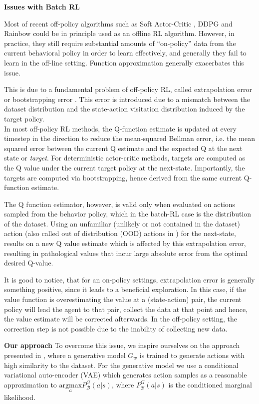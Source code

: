 \textbf{Issues with Batch RL}

Most of recent off-policy algorithms such as Soft Actor-Critic \citep{Haarnoja2018}, 
DDPG \citep{Lillicrap2016} and Rainbow \citep{Hessel2018}  could be in principle used 
as an offline RL algorithm. However, in practice, they still require substantial amounts
of “on-policy” data from the current behavioral policy in order to learn effectively, 
and generally they fail to learn in the off-line setting. Function approximation generally exacerbates this issue.


This is due to a fundamental problem of off-policy RL, called extrapolation error \citep{Fujimoto2019} or 
bootstrapping error \citep{Kumar2019}. This error is introduced due to a mismatch
between the dataset distribution and the state-action visitation distribution induced by the
target policy.\\
In most off-policy RL methods, the Q-function estimate is updated at every timestep 
in the direction to reduce the mean-squared Bellman error, i.e. the 
mean squared error between the current Q estimate and
the expected Q at the next state or \textit{target}.
For deterministic actor-critic methods, targets are computed as the Q value under the current
target policy at the next-state.
Importantly, the targets are computed via bootstrapping, hence derived from the same current
Q-function estimate.

The Q function estimator, however, is valid only when evaluated on actions sampled
from the behavior policy, which in the batch-RL case is the distribution of the dataset.
Using an unfamiliar (unlikely or not contained in the dataset) action
(also called out of distribution (OOD) actions in \citep{Kumar2019}) for the next-state,
results on a new Q value estimate which is affected by this extrapolation error,
resulting in pathological values that incur large absolute error from the optimal desired Q-value.

It is good to notice, that for an on-policy settings, extrapolation error is generally something positive, since it
leads to a beneficial exploration. In this case, if the value function is overestimating the value at
a (state-action) pair, the current policy will lead the agent to that pair, collect the data at that point
and hence, the value estimate will be corrected afterwards.
In the off-policy setting, the correction step is not possible due to the inability of collecting new data.



\textbf{Our approach}
To overcome this issue, we inspire ourselves on the approach presented in \citet{Fujimoto2019}, where a
generative model $G_w$ is trained to generate actions with high similarity to the dataset.
For the generative model we use a conditional variational auto-encoder (VAE) \cite{Kingma2014} which
generates action samples as a reasonable approximation to
$\underset{a}{\text{argmax}}  P _\mathcal{B}^G(a|s)$, where $P _\mathcal{B}^G(a|s)$ is the 
conditioned marginal likelihood.

